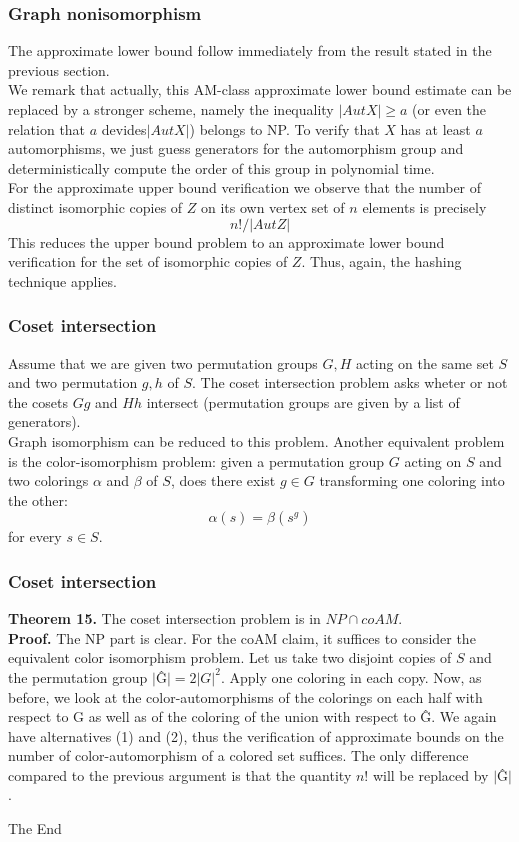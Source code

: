 \documentclass{beamer}
\begin{document}
\begin{frame}
\frametitle{Graph nonisomorphism}
The approximate lower bound follow immediately from the result stated in the previous section. \\
We remark that actually, this AM-class approximate lower bound estimate can be replaced by a stronger scheme, namely the inequality $|Aut X| \geq a$ (or even the relation that $a$ devides$|Aut X|$) belongs to NP. To verify that $X$ has at least $a$ automorphisms, we just guess generators for the automorphism group and deterministically compute the order of this group in polynomial time.\\
For the approximate upper bound verification we observe that the number of distinct isomorphic copies of $Z$ on its own vertex set of $n$ elements is precisely $$n! / |Aut Z|$$
This reduces the upper bound problem to an approximate lower bound verification for the set of isomorphic copies of $Z$. Thus, again, the hashing technique applies.
\end{frame}

\begin{frame}
\frametitle{Coset intersection}
Assume that we are given two permutation groups $G, H$ acting on the same set $S$ and two permutation $g, h$ of $S$. The coset intersection problem asks wheter or not the cosets $Gg$ and $Hh$ intersect (permutation groups are given by a list of generators).\\
Graph isomorphism can be reduced to this problem. Another equivalent problem is the color-isomorphism problem: given a permutation group $G$ acting on $S$ and two colorings $\alpha$ and $\beta$ of $S$, does there exist $g \in G$ transforming one coloring into the other:$$\alpha(s) = \beta(s^g)$$
for every $s \in S$.
\end{frame}

\begin{frame}
\frametitle{Coset intersection}
\textbf{Theorem 15.} The coset intersection problem is in $NP \cap coAM$.\\
\textbf{Proof.} The NP part is clear. For the coAM claim, it suffices to consider the equivalent color isomorphism problem. Let us take two disjoint copies of $S$ and the permutation group $|$\^{G}$| = 2|G|^2$. Apply one coloring in each copy. Now, as before, we look at the color-automorphisms of the colorings on each half with respect to G as well as of the coloring of the union with respect to \^{G}. We again have alternatives (1) and (2), thus the verification of approximate bounds on the number of color-automorphism of a colored set suffices. The only difference compared to the previous argument is that the quantity $n!$ will be replaced by $|$\^{G}$|$.

\end{frame}

\begin{frame}
\Huge{\centerline{The End}}
\end{frame}

\end{document}
